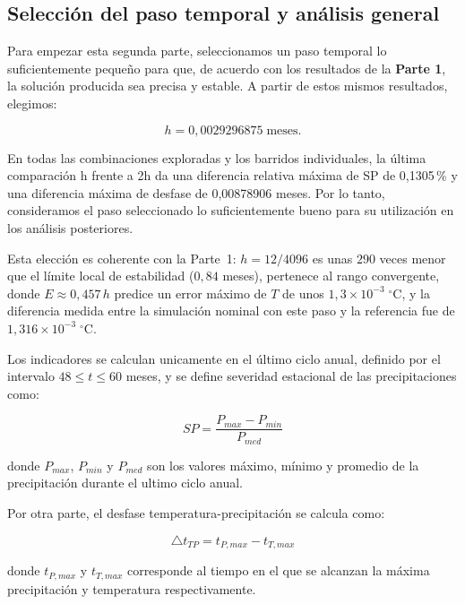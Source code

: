 \subsection{Selección del paso temporal y análisis general}

Para empezar esta segunda parte, seleccionamos un paso temporal lo suficientemente pequeño para que, de acuerdo con los resultados de la \textbf{Parte 1}, la solución producida sea precisa y estable. A partir de estos mismos resultados, elegimos:

\begin{equation}
    \boxed{h = 0{,}0029296875 \;\mathrm{meses}}.
\end{equation}

En todas las combinaciones exploradas y los barridos individuales, la última comparación h frente a 2h da una diferencia relativa máxima de SP de 0{,}1305\,\% y una diferencia máxima de desfase de 0{,}00878906 meses. Por lo tanto, consideramos el paso seleccionado lo suficientemente bueno para su utilización en los análisis posteriores.

Esta elección es coherente con la Parte~1: $h=12/4096$ es unas $290$ veces menor que el límite local de estabilidad ($0{,}84$ meses), pertenece al rango convergente, donde $E\approx0{,}457\,h$ predice un error máximo de $T$ de unos $1{,}3\times10^{-3}\;{}^\circ\mathrm{C}$, y la diferencia medida entre la simulación nominal con este paso y la referencia fue de $1{,}316\times10^{-3}\;{}^\circ\mathrm{C}$.

Los indicadores se calculan unicamente en el último ciclo anual, definido por el intervalo $48 \le t \le 60$ meses, y se define severidad estacional de las precipitaciones como:

\begin{equation}
    SP = \frac{P_{max} - P_{min}}{P_{med}}
\end{equation}


donde $P_{max}$, $P_{min}$ y $P_{med}$ son los valores máximo, mínimo y promedio de la precipitación durante el ultimo ciclo anual.

Por otra parte, el desfase temperatura-precipitación se calcula como:

\begin{equation}
    \triangle t_{TP} = t_{P,max} - t_{T,max}
\end{equation}

donde $t_{P,max}$ y $t_{T,max}$ corresponde al tiempo en el que se alcanzan la máxima precipitación y temperatura respectivamente.

